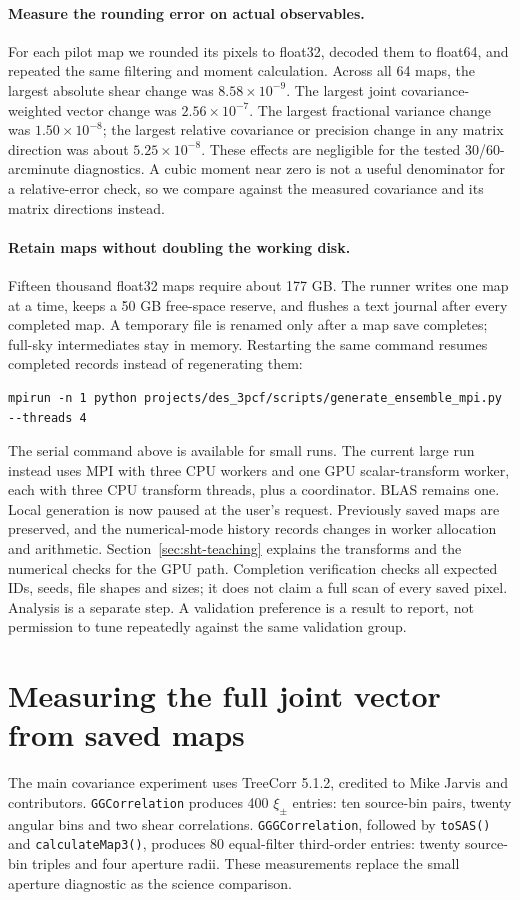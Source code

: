 \documentclass[11pt]{article}
\begin{document}
\paragraph{Measure the rounding error on actual observables.}
For each pilot map we rounded its pixels to float32, decoded them to
float64, and repeated the same filtering and moment calculation. Across
all 64 maps, the largest absolute shear change was $8.58\times10^{-9}$.
The largest joint covariance-weighted vector change was
$2.56\times10^{-7}$. The largest fractional variance change was
$1.50\times10^{-8}$; the largest relative covariance or precision change
in any matrix direction was about $5.25\times10^{-8}$. These effects are
negligible for the tested 30/60-arcminute diagnostics. A cubic moment near
zero is not a useful denominator for a relative-error check, so we compare
against the measured covariance and its matrix directions instead.

\paragraph{Retain maps without doubling the working disk.}
Fifteen thousand float32 maps require about 177 GB. The runner writes one
map at a time, keeps a 50 GB free-space reserve, and flushes a text journal
after every completed map. A temporary file is renamed only after a map
save completes; full-sky intermediates stay in memory. Restarting the same
command resumes completed records instead of regenerating them:
\begin{lstlisting}
mpirun -n 1 python projects/des_3pcf/scripts/generate_ensemble_mpi.py --threads 4
\end{lstlisting}
The serial command above is available for small runs. The current large
run instead uses MPI with three CPU workers and one GPU scalar-transform
worker, each with three CPU transform threads, plus a coordinator. BLAS
remains one. Local generation is now paused at the user's request. Previously
saved maps are preserved, and the numerical-mode history records changes
in worker allocation and arithmetic. Section~\ref{sec:sht-teaching}
explains the transforms and the numerical checks for the GPU path.
Completion verification checks all expected IDs, seeds, file shapes and
sizes; it does not claim a full scan of every saved pixel. Analysis is a
separate step. A validation preference is a result to report, not permission
to tune repeatedly against the same validation group.

\section{Measuring the full joint vector from saved maps}
The main covariance experiment uses TreeCorr 5.1.2, credited to Mike Jarvis
and contributors. \texttt{GGCorrelation} produces 400 $\xi_\pm$ entries:
ten source-bin pairs, twenty angular bins and two shear correlations.
\texttt{GGGCorrelation}, followed by \texttt{toSAS()} and
\texttt{calculateMap3()}, produces 80 equal-filter third-order entries:
twenty source-bin triples and four aperture radii. These measurements
replace the small aperture diagnostic as the science comparison.
\end{document}
